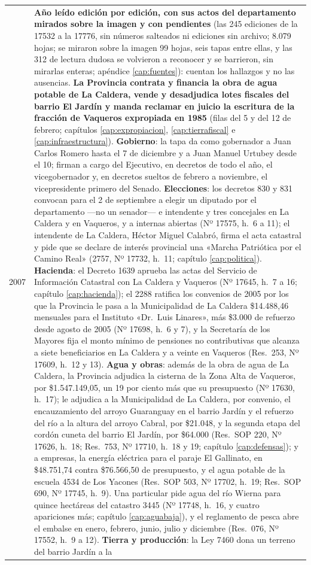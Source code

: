 \begin{longtable}{@{}p{2.7cm}p{10.3cm}@{}}
2007 & \textbf{Año leído edición por edición, con sus actos del departamento mirados sobre la imagen y con pendientes} (las 245 ediciones de la 17532 a la 17776, sin números salteados ni ediciones sin archivo; 8.079 hojas; se miraron sobre la imagen 99 hojas, seis tapas entre ellas, y las 312 de lectura dudosa se volvieron a reconocer y se barrieron, sin mirarlas enteras; apéndice \ref{cap:fuentes}): cuentan los hallazgos y no las ausencias. \textbf{La Provincia contrata y financia la obra de agua potable de La Caldera, vende y desadjudica lotes fiscales del barrio El Jardín y manda reclamar en juicio la escritura de la fracción de Vaqueros expropiada en 1985} (filas del 5 y del 12 de febrero; capítulos \ref{cap:expropiacion}, \ref{cap:tierrafiscal} e \ref{cap:infraestructura}). \textbf{Gobierno}: la tapa da como gobernador a Juan Carlos Romero hasta el 7 de diciembre y a Juan Manuel Urtubey desde el 10; firman a cargo del Ejecutivo, en decretos de todo el año, el vicegobernador y, en decretos sueltos de febrero a noviembre, el vicepresidente primero del Senado. \textbf{Elecciones}: los decretos 830 y 831 convocan para el 2 de septiembre a elegir un diputado por el departamento ---no un senador--- e intendente y tres concejales en La Caldera y en Vaqueros, y a internas abiertas (Nº 17575, h.\ 6 a 11); el intendente de La Caldera, Héctor Miguel Calabró, firma el acta catastral y pide que se declare de interés provincial una «Marcha Patriótica por el Camino Real» (2757, Nº 17732, h.\ 11; capítulo \ref{cap:politica}). \textbf{Hacienda}: el Decreto 1639 aprueba las actas del Servicio de Información Catastral con La Caldera y Vaqueros (Nº 17645, h.\ 7 a 16; capítulo \ref{cap:hacienda}); el 2288 ratifica los convenios de 2005 por los que la Provincia le pasa a la Municipalidad de La Caldera \$14.488,46 mensuales para el Instituto «Dr.\ Luis Linares», más \$3.000 de refuerzo desde agosto de 2005 (Nº 17698, h.\ 6 y 7), y la Secretaría de los Mayores fija el monto mínimo de pensiones no contributivas que alcanza a siete beneficiarios en La Caldera y a veinte en Vaqueros (Res.\ 253, Nº 17609, h.\ 12 y 13). \textbf{Agua y obras}: además de la obra de agua de La Caldera, la Provincia adjudica la cisterna de la Zona Alta de Vaqueros, por \$1.547.149,05, un 19 por ciento más que su presupuesto (Nº 17630, h.\ 17); le adjudica a la Municipalidad de La Caldera, por convenio, el encauzamiento del arroyo Guaranguay en el barrio Jardín y el refuerzo del río a la altura del arroyo Cabral, por \$21.048, y la segunda etapa del cordón cuneta del barrio El Jardín, por \$64.000 (Res.\ SOP 220, Nº 17626, h.\ 18; Res.\ 753, Nº 17710, h.\ 18 y 19; capítulo \ref{cap:defensas}); y a empresas, la energía eléctrica para el paraje El Gallinato, en \$48.751,74 contra \$76.566,50 de presupuesto, y el agua potable de la escuela 4534 de Los Yacones (Res.\ SOP 503, Nº 17702, h.\ 19; Res.\ SOP 690, Nº 17745, h.\ 9). Una particular pide agua del río Wierna para quince hectáreas del catastro 3445 (Nº 17748, h.\ 16, y cuatro apariciones más; capítulo \ref{cap:aguabaja}), y el reglamento de pesca abre el embalse en enero, febrero, junio, julio y diciembre (Res.\ 076, Nº 17552, h.\ 9 a 12). \textbf{Tierra y producción}: la Ley 7460 dona un terreno del barrio Jardín a la 
\end{longtable}
